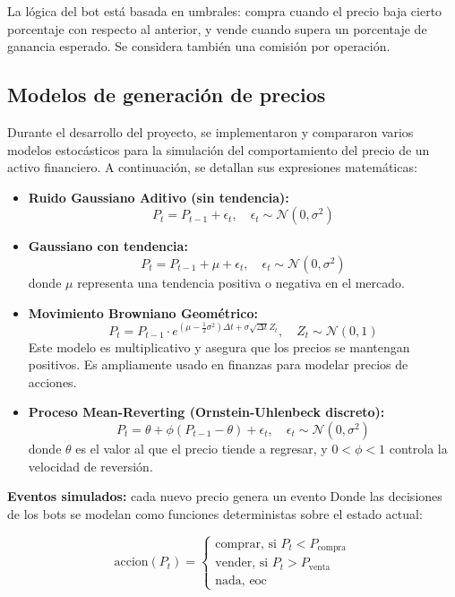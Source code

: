 \documentclass[a4paper,12pt]{article}
\begin{document}
La lógica del bot está basada en umbrales: compra cuando el precio baja cierto porcentaje con respecto 
al anterior, y vende cuando supera un porcentaje de ganancia esperado. Se considera también una comisión por operación.

\subsection*{Modelos de generación de precios}

Durante el desarrollo del proyecto, se implementaron y compararon varios modelos estocásticos para la simulación del comportamiento del precio de un activo financiero. A continuación, se detallan sus expresiones matemáticas:

\begin{itemize}
    \item \textbf{Ruido Gaussiano Aditivo (sin tendencia):}
    \[
    P_t = P_{t-1} + \epsilon_t, \quad \epsilon_t \sim \mathcal{N}(0, \sigma^2)
    \]
    
    \item \textbf{Gaussiano con tendencia:}
    \[
    P_t = P_{t-1} + \mu + \epsilon_t, \quad \epsilon_t \sim \mathcal{N}(0, \sigma^2)
    \]
    donde $\mu$ representa una tendencia positiva o negativa en el mercado.

    \item \textbf{Movimiento Browniano Geométrico:}
    \[
    P_t = P_{t-1} \cdot e^{(\mu - \frac{1}{2} \sigma^2) \Delta t + \sigma \sqrt{\Delta t} Z_t}, \quad Z_t \sim \mathcal{N}(0, 1)
    \]
    Este modelo es multiplicativo y asegura que los precios se mantengan positivos. Es ampliamente usado en finanzas para modelar precios de acciones.

    \item \textbf{Proceso Mean-Reverting (Ornstein-Uhlenbeck discreto):}
    \[
    P_t = \theta + \phi(P_{t-1} - \theta) + \epsilon_t, \quad \epsilon_t \sim \mathcal{N}(0, \sigma^2)
    \]
    donde $\theta$ es el valor al que el precio tiende a regresar, y $0 < \phi < 1$ controla la velocidad de reversión.
\end{itemize}


\textbf{Eventos simulados:} cada nuevo precio genera un evento Donde las decisiones de los bots se modelan como funciones deterministas sobre el estado actual:

\[\text{accion}(P_t) = 
    \begin{cases}  
        \text{comprar, si }P_t < P_{\text{compra}}\\
        \text{vender, si }P_t > P_{\text{venta}}\\
        \text{nada, eoc}
    \end{cases} 
\]
\end{document}
